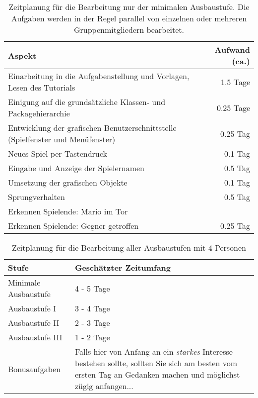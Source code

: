 \begin{table}[htb]
\begin{center}\begin{tabular}{|p{}|r|}\hline
\textbf{Aspekt} & \textbf{Aufwand (ca.)}\\\hline\hline

Einarbeitung in die Aufgabenstellung und Vorlagen, Lesen des Tutorials & 1.5 Tage\\\hline

Einigung auf die grunds\"atzliche Klassen- und Packagehierarchie & 0.25 Tage\\\hline

Entwicklung der grafischen Benutzerschnittstelle (Spielfenster und Menüfenster) & 0.25 Tag\\\hline

Neues Spiel per Tastendruck & 0.1 Tag\\\hline

Eingabe und Anzeige der Spielernamen & 0.5 Tag\\\hline

Umsetzung der grafischen Objekte & 0.1 Tag\\\hline

Sprungverhalten & 0.5 Tag \\\hline

Erkennen Spielende: Mario im Tor  \\\hline

Erkennen Spielende: Gegner getroffen & 0.25 Tag \\\hline
\end{tabular}
\caption{Zeitplanung f\"ur die Bearbeitung \glqq{}nur\grqq{} der minimalen Ausbaustufe.
Die Aufgaben werden in der Regel parallel von einzelnen oder mehreren Gruppenmitgliedern bearbeitet.}
\label{tab:zeitplanMinimal}
\end{center}
\end{table}

\begin{table}[htb]
\begin{center}
\begin{tabular}{|p{}|p{}|}\hline
\textbf{Stufe} & \textbf{Gesch\"atzter Zeitumfang}\\\hline\hline
   Minimale Ausbaustufe & 4 - 5 Tage \\\hline

   Ausbaustufe I & 3 - 4 Tage \\\hline

   Ausbaustufe II & 2 - 3 Tage \\\hline

   Ausbaustufe III & 1 - 2 Tage \\\hline

   Bonusaufgaben & Falls hier von Anfang an ein \emph{starkes} Interesse bestehen
   sollte, sollten Sie sich am besten vom ersten Tag an Gedanken machen und m\"oglichst z\"ugig anfangen...\\\hline
\end{tabular}
\caption{Zeitplanung f\"ur die Bearbeitung aller Ausbaustufen mit 4 Personen}
\label{tab:zeitplanAlles}
\end{center}
\end{table}

